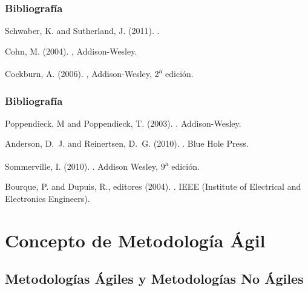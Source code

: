\documentclass[animated,a4paper,slidestop,xcolor=pst,blue]{beamer}
\begin{document}
\begin{frame}[c]
    \frametitle{Bibliografía}
    \begin{thebibliography}{1}

    Schwaber, K. and Sutherland, J. (2011).
    .

    Cohn, M. (2004).
    ,
    \newblock Addison-Wesley.

    Cockburn, A. (2006).
    ,
    \newblock Addison-Wesley, 2\textsuperscript{a} edición.

    \end{thebibliography}
\end{frame}

\begin{frame}[c]
    \frametitle{Bibliografía}
    \begin{thebibliography}{1}
    {Poppendieck, M and Poppendieck, T.} (2003).
    .
    \newblock Addison-Wesley.

    Anderson, D.~J. and Reinertsen, D.~G. (2010).
    .
    \newblock Blue Hole Press.

    Sommerville, I. (2010).
    .
    \newblock Addison Wesley, 9\textsuperscript{a} edición.

    Bourque, P. and Dupuis, R., editores (2004).
    .
    \newblock IEEE (Institute of Electrical and Electronics Engineers).
    \end{thebibliography}
\end{frame}

\section{Concepto de Metodología Ágil}

\subsection{Metodologías Ágiles y Metodologías No Ágiles}
\end{document}
